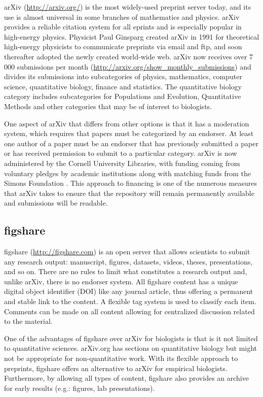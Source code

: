 \documentclass[letterpaper,twocolumn,superscriptaddress,showkeys,longbibliography]{revtex4-1}
\begin{document}
arXiv (\url{http://arxiv.org/}) is the most widely-used preprint server today,
and its use is almost universal in some branches of mathematics and physics.
arXiv provides a reliable citation system for all eprints and is especially
popular in high-energy physics. Physicist Paul Ginsparg created arXiv in 1991
for theoretical high-energy physicists to communicate preprints via email and
ftp, and soon thereafter adopted the newly created world-wide
web\cite{jackson2002preprints}.  arXiv now receives over 7 000 submissions per
month (\url{http://arxiv.org/show_monthly_submissions}) and divides its
submissions into subcategories of physics, mathematics, computer science,
quantitative biology, finance and statistics.  The quantitative biology category
includes subcategories for Populations and Evolution, Quantitative Methods and
other categories that may be of interest to biologists.

One aspect of arXiv that differs from other options is that it has a moderation
system, which requires that papers must be categorized by an endorser.
At least one author of a paper must be an endorser that has previously submitted
a paper or has received permission to submit to a particular category. arXiv is now
administered by the Cornell University Libraries, with funding coming from
voluntary pledges by academic institutions along with matching funds from the
Simons Foundation \cite{arxiv_future}. This approach to financing is one of
the numerous measures that arXiv takes to ensure that the repository will remain
permanently available and submissions will be readable.

\subsection{figshare}

figshare (\href{http://figshare.com}{http://figshare.com}) is an open server
that allows scientists to submit any research output: manuscript, figures,
datasets, videos, theses, presentations, and so on. There are no rules to limit
what constitutes a research output and, unlike arXiv, there is no endorser
system. All figshare content has a unique digital object identifier (DOI) like
any journal article, thus offering a permanent and stable link to the content.
A flexible tag system is used to classify each item. Comments can be made on all
content allowing for centralized discussion related to the material.

One of the advantages of figshare over arXiv for biologists is that is it not limited
to quantitative sciences. arXiv.org has sections on quantitative biology but might
not be appropriate for non-quantitative work. With its flexible approach to
preprints, figshare offers an alternative to arXiv for empirical
biologists. Furthermore, by allowing all types of content, figshare also
provides an archive for early results (e.g.: figures, lab presentations).
\end{document}
